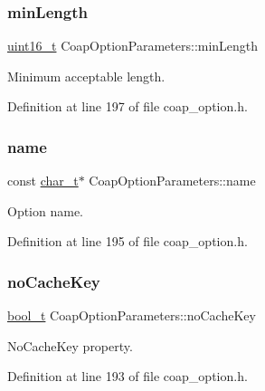 \subsubsection{\texorpdfstring{min\+Length}{minLength}}
{\footnotesize\ttfamily \hyperlink{stdint_8h_a273cf69d639a59973b6019625df33e30}{uint16\+\_\+t} Coap\+Option\+Parameters\+::min\+Length}



Minimum acceptable length. 



Definition at line 197 of file coap\+\_\+option.\+h.

\mbox{\label{structCoapOptionParameters_a151ae1dd2cf33031d384a3f351f18959}} 
\subsubsection{\texorpdfstring{name}{name}}
{\footnotesize\ttfamily const \hyperlink{compiler__port_8h_a40bb5262bf908c328fbcfbe5d29d0201}{char\+\_\+t}$\ast$ Coap\+Option\+Parameters\+::name}



Option name. 



Definition at line 195 of file coap\+\_\+option.\+h.

\mbox{\label{structCoapOptionParameters_a1fd05d8feeb0244022299e6dc8ac0d25}} 
\subsubsection{\texorpdfstring{no\+Cache\+Key}{noCacheKey}}
{\footnotesize\ttfamily \hyperlink{compiler__port_8h_a812d16e5494522586b3784e55d479912}{bool\+\_\+t} Coap\+Option\+Parameters\+::no\+Cache\+Key}



No\+Cache\+Key property. 



Definition at line 193 of file coap\+\_\+option.\+h.

\mbox{\label{structCoapOptionParameters_a149855f85b884bee212aa0edb485665c}} 
